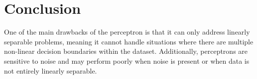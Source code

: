 \documentclass[10pt,twocolumn,letterpaper]{article}
\begin{document}
\section{Conclusion}
One of the main drawbacks of the perceptron is that it can only address linearly separable problems, meaning it cannot handle situations where there are multiple non-linear decision boundaries within the dataset. Additionally, perceptrons are sensitive to noise and may perform poorly when noise is present or when data is not entirely linearly separable.

{\small
	
	
}
\end{document}

